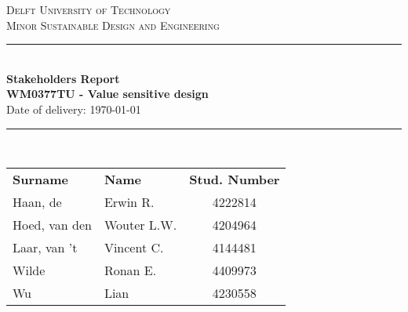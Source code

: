 \begin{titlepage}
\begin{center}
\textsc{\LARGE Delft University of Technology }\\[0.3cm]
\textsc{\Large Minor Sustainable Design and Engineering}\\[0.5cm]

\rule{\linewidth}{0.04cm} \\[0.4cm]
{\LARGE \bfseries Stakeholders Report\\[0.2cm]}
{\large \bfseries WM0377TU - Value sensitive design}\\ \vspace{5mm}
Date of delivery: \today \\
\rule{\linewidth}{0.04cm} \\[0.9cm]

\vspace{50 mm}

\begin{table}[!h]
\centering
\begin{tabular}{| l l c}
\textbf{Surname} & \textbf{Name} & \textbf{Stud. Number} \\
Haan, de & Erwin R.& 4222814 \\
Hoed, van den & Wouter L.W. & 4204964 \\
Laar, van 't & Vincent C. & 4144481 \\
Wilde & Ronan E.& 4409973 \\
Wu & Lian & 4230558 \\

\end{tabular}
\end{table}



\end{center}
\end{titlepage}
